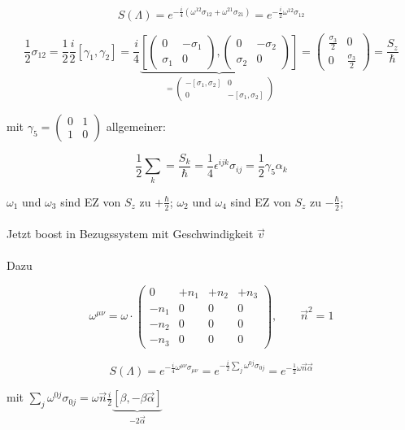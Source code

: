 \[S(\Lambda) = e^{-\frac{i}{4}(\omega^{12}\sigma_{12}+\omega^{21}\sigma_{21})}= e^{-\frac{i}{2}\omega^{12}\sigma_{12}}\]

\[\frac{1}{2}\sigma_{12} = \frac{1}{2}\frac{i}{2}[\gamma_1,\gamma_2] = \frac{i}{4}\underbrace{\left[ \begin{pmatrix} 0&-\sigma_1\\   \sigma_1&0 \end{pmatrix}, \begin{pmatrix} 0&-\sigma_2\\   \sigma_2&0 \end{pmatrix} \right]}_{=  \begin{pmatrix} -[\sigma_1,\sigma_2]&0\\  0&- [\sigma_1,\sigma_2] \end{pmatrix}  } =  \begin{pmatrix} \frac{\sigma_3}{2}&0\\0& \frac{\sigma_3}{2} \end{pmatrix} = \frac{S_z}{\hbar} \]


mit \(\gamma_5 = \begin{pmatrix} 0&1\\   1&0 \end{pmatrix} \) allgemeiner:

\[\frac{1}{2}\sum_k = \frac{S_k}{\hbar} = \frac{1}{4} \epsilon^{ijk}\sigma_{ij} = \frac{1}{2} \gamma_5\alpha_k\]

\(\omega_1\) und \(\omega_3\) sind EZ von \(S_z\) zu \(+\frac{\hbar}{2}\); \(\omega_2\) und \(\omega_4\) sind EZ von \(S_z\) zu \(-\frac{\hbar}{2}\);\\
\\
Jetzt boost in Bezugssystem mit Geschwindigkeit \(\vec v\)\\
\\
Dazu

\[\omega^{\mu\nu}   =\omega\cdot\begin{pmatrix} 0&+n_1&+n_2&+n_3\\  -n_1&0&0&0\\   -n_2&0&0&0\\  -n_3&0&0&0 \end{pmatrix},\qquad \vec n^2 = 1 \]

\[ S(\Lambda) = e^{-\frac{i}{4}\omega^{\mu\nu}\sigma_{\mu\nu}}  = e^{-\frac{i}{2}\sum_j\omega^{0j}\sigma_{0j}} = e^{-\frac{1}{2}\omega \vec n\vec \alpha}  \]

mit \( \sum_j\omega^{0j}\sigma_{0j} = \omega \vec n \frac{i}{2}\underbrace{[\beta,-\beta\vec\alpha]}_{-2\vec\alpha} \)

